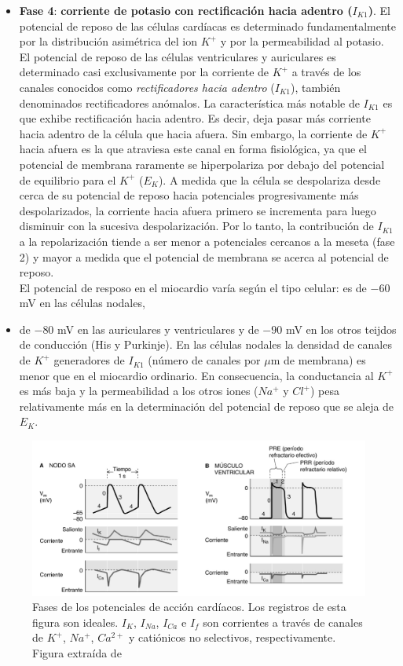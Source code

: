 \begin{itemize}
  \item \textbf{Fase 4}: \textbf{corriente de potasio con rectificación hacia adentro ($I_{K1}$)}. El potencial de reposo de las células cardíacas es determinado fundamentalmente por la distribución asimétrica del ion $K^+$ y por la permeabilidad al potasio. El potencial de reposo de las células ventriculares y auriculares es determinado casi exclusivamente por la corriente de $K^+$ a través de los canales conocidos como \textit{rectificadores hacia adentro} ($I_{K1}$), también denominados rectificadores anómalos. La característica más notable de $I_{K1}$ es que exhibe rectificación hacia adentro. Es decir, deja pasar más corriente hacia adentro de la célula que hacia afuera. Sin embargo, la corriente de $K^+$ hacia afuera es la que atraviesa este canal en forma fisiológica, ya que el potencial de membrana raramente se hiperpolariza por debajo del potencial de equilibrio para el $K^+$ ($E_K$). A medida que la célula se despolariza desde cerca de su potencial de reposo hacia potenciales progresivamente más despolarizados, la corriente hacia afuera primero se incrementa para luego disminuir con la sucesiva despolarización. Por lo tanto, la contribución de $I_{K1}$ a la repolarización tiende a ser menor a potenciales cercanos a la meseta (fase 2) y mayor a medida que el potencial de membrana se acerca al potencial de reposo. \\
  El potencial de resposo en el miocardio varía según el tipo celular: es de $-60$ mV en las células nodales,
  \item de $-80$ mV en las auriculares y ventriculares y de $-90$ mV en los otros teijdos de conducción (His y Purkinje). En las células nodales la densidad de canales de $K^+$ generadores de $I_{K1}$ (número de canales por $\mu$m de membrana) es menor que en el miocardio ordinario. En consecuencia, la conductancia al $K^+$ es más baja y la permeabilidad a los otros iones ($Na^+$ y $Cl^+$) pesa relativamente más en la determinación del potencial de reposo que se aleja de $E_K$.
\end{itemize}

\begin{figure}[H]
  \centering
  \includegraphics[scale=0.45]{sections/chapter-02/images/action_potential_phases.png}
  \caption[Fases de los potenciales de acción cardíacos.]{Fases de los potenciales de acción cardíacos. Los
  registros de esta figura son ideales. $I_K$, $I_{Na}$, $I_{Ca}$ e $I_f$ son corrientes a través de canales
  de $K^+$, $Na^+$, $Ca^{2+}$ y catiónicos no selectivos, respectivamente. Figura extraída de \cite{bk:boron3ed}}
  \label{fig:action_potential_phases}
\end{figure}

